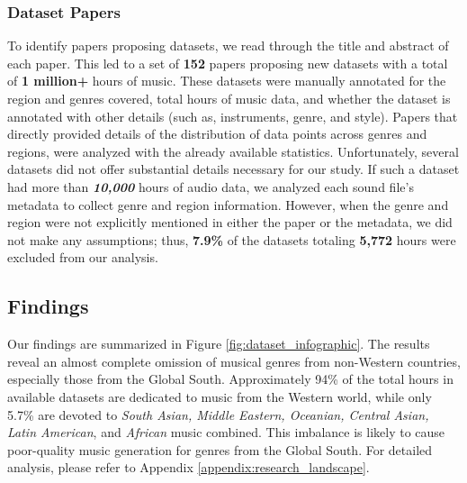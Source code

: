 \subsubsection{Dataset Papers}
To identify papers proposing datasets, we read through the title and abstract of each paper. This led to a set of  \textbf{152} papers proposing new datasets with a total of \textbf{1 million+} hours of music. These datasets were manually annotated for the region and genres covered, total hours of music data, and whether the dataset is annotated with other details (such as, instruments, genre, and style). Papers that directly provided details of the distribution of data points across genres and regions, were analyzed with the already available statistics. Unfortunately, several datasets did not offer substantial details necessary for our study. If such a dataset had more than \textit{\textbf{10,000}} hours of audio data, we analyzed each sound file's metadata to collect genre and region information. However, when the genre and region were not explicitly mentioned in either the paper or the metadata, we did not make any assumptions; thus, \textbf{7.9\%} of the datasets totaling\textbf{ 5,772} hours were excluded from our analysis. 

\subsection{Findings}
Our findings are summarized in Figure \ref{fig:dataset_infographic}. The results reveal an almost complete omission of musical genres from non-Western countries, especially those from the Global South. Approximately 94\% of the total hours in available datasets are dedicated to music from the Western world, while only 5.7\% are devoted to \textit{South Asian, Middle Eastern, Oceanian, Central Asian, Latin American}, and \textit{African} music combined. This imbalance is likely to cause poor-quality music generation for genres from the Global South. For detailed analysis, please refer to Appendix \ref{appendix:research_landscape}.




